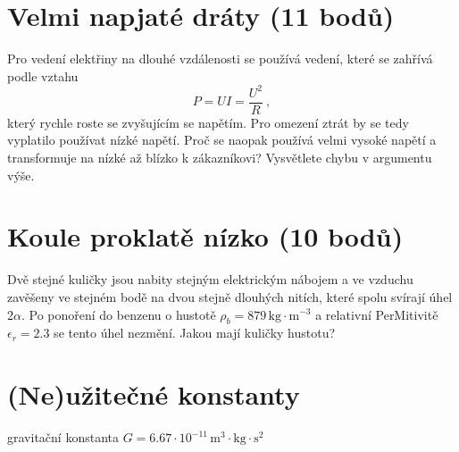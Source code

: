 \documentclass[10pt,a4paper,landscape]{article}
\begin{document}
\begin{multicols}{2}[]
\section{Velmi napjaté dráty (11 bodů)}
Pro vedení elektřiny na dlouhé vzdálenosti se používá vedení, které se zahřívá podle vztahu
\begin{equation}
P = UI = \frac{U^2}{R} ~,
\end{equation}
který rychle roste se zvyšujícím se napětím. Pro omezení ztrát by se tedy vyplatilo používat nízké napětí. Proč se naopak používá velmi vysoké napětí a transformuje na nízké až blízko k zákazníkovi? Vysvětlete chybu v argumentu výše.

\section{Koule proklatě nízko (10 bodů)}
Dvě stejné kuličky jsou nabity stejným elektrickým nábojem a ve vzduchu zavěšeny ve stejném bodě na dvou stejně dlouhých nitích, které spolu svírají úhel $2\alpha$. Po ponoření do benzenu o hustotě $\rho_b = 879\,\mathrm{kg}\cdot\mathrm{m}^{-3}$ a relativní PerMitivitě $\epsilon_r = 2.3$ se tento úhel nezmění. Jakou mají kuličky hustotu?

\section*{(Ne)užitečné konstanty}
gravitační konstanta $G = 6.67\cdot 10^{-11}\, \mathrm{m}^3\cdot\mathrm{kg}\cdot \mathrm{s}^2$

\end{multicols}
\end{document}
